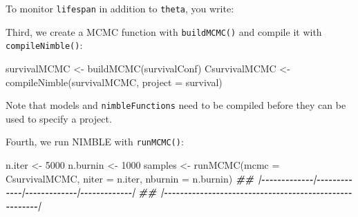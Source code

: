 \documentclass[
  12pt,
]{krantz}
\newenvironment{Shaded}{\begin{snugshade}}{\end{snugshade}}
\newcommand{\AttributeTok}[1]{\textcolor[rgb]{0.77,0.63,0.00}{#1}}
\newcommand{\DecValTok}[1]{\textcolor[rgb]{0.00,0.00,0.81}{#1}}
\newcommand{\DocumentationTok}[1]{\textcolor[rgb]{0.56,0.35,0.01}{\textbf{\textit{#1}}}}
\newcommand{\FunctionTok}[1]{\textcolor[rgb]{0.00,0.00,0.00}{#1}}
\newcommand{\NormalTok}[1]{#1}
\newcommand{\OtherTok}[1]{\textcolor[rgb]{0.56,0.35,0.01}{#1}}
\newcommand{\SpecialCharTok}[1]{\textcolor[rgb]{0.00,0.00,0.00}{#1}}
\newcommand{\StringTok}[1]{\textcolor[rgb]{0.31,0.60,0.02}{#1}}
\begin{document}
To monitor \texttt{lifespan} in addition to \texttt{theta}, you write:

\begin{Shaded}
\end{Shaded}

Third, we create a MCMC function with \texttt{buildMCMC()} and compile it with \texttt{compileNimble()}:

\begin{Shaded}
\begin{Highlighting}[]
\NormalTok{survivalMCMC }\OtherTok{\textless{}{-}} \FunctionTok{buildMCMC}\NormalTok{(survivalConf)}
\NormalTok{CsurvivalMCMC }\OtherTok{\textless{}{-}} \FunctionTok{compileNimble}\NormalTok{(survivalMCMC, }\AttributeTok{project =}\NormalTok{ survival)}
\end{Highlighting}
\end{Shaded}

Note that models and \texttt{nimbleFunctions} need to be compiled before they can be used to specify a project.

Fourth, we run NIMBLE with \texttt{runMCMC()}:

\begin{Shaded}
\begin{Highlighting}[]
\NormalTok{n.iter }\OtherTok{\textless{}{-}} \DecValTok{5000}
\NormalTok{n.burnin }\OtherTok{\textless{}{-}} \DecValTok{1000}
\NormalTok{samples }\OtherTok{\textless{}{-}} \FunctionTok{runMCMC}\NormalTok{(}\AttributeTok{mcmc =}\NormalTok{ CsurvivalMCMC, }
                   \AttributeTok{niter =}\NormalTok{ n.iter,}
                   \AttributeTok{nburnin =}\NormalTok{ n.burnin)}
\DocumentationTok{\#\# |{-}{-}{-}{-}{-}{-}{-}{-}{-}{-}{-}{-}{-}|{-}{-}{-}{-}{-}{-}{-}{-}{-}{-}{-}{-}{-}|{-}{-}{-}{-}{-}{-}{-}{-}{-}{-}{-}{-}{-}|{-}{-}{-}{-}{-}{-}{-}{-}{-}{-}{-}{-}{-}|}
\DocumentationTok{\#\# |{-}{-}{-}{-}{-}{-}{-}{-}{-}{-}{-}{-}{-}{-}{-}{-}{-}{-}{-}{-}{-}{-}{-}{-}{-}{-}{-}{-}{-}{-}{-}{-}{-}{-}{-}{-}{-}{-}{-}{-}{-}{-}{-}{-}{-}{-}{-}{-}{-}{-}{-}{-}{-}{-}{-}|}
\end{Highlighting}
\end{Shaded}
\end{document}

